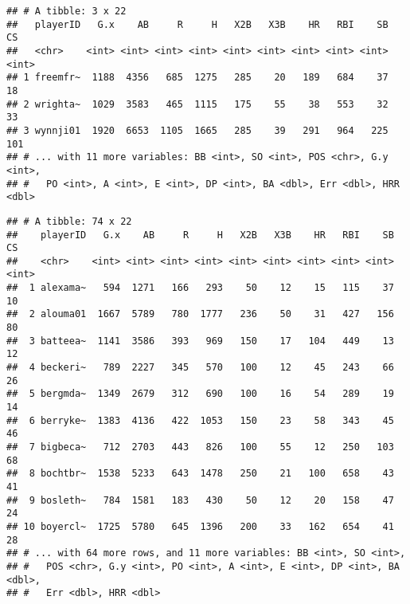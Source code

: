 \documentclass[]{book}
\newenvironment{Shaded}{\begin{snugshade}}{\end{snugshade}}
\newcommand{\KeywordTok}[1]{\textcolor[rgb]{0.13,0.29,0.53}{\textbf{#1}}}
\newcommand{\DecValTok}[1]{\textcolor[rgb]{0.00,0.00,0.81}{#1}}
\newcommand{\StringTok}[1]{\textcolor[rgb]{0.31,0.60,0.02}{#1}}
\newcommand{\OperatorTok}[1]{\textcolor[rgb]{0.81,0.36,0.00}{\textbf{#1}}}
\newcommand{\NormalTok}[1]{#1}
\begin{document}
\begin{verbatim}
## # A tibble: 3 x 22
##   playerID   G.x    AB     R     H   X2B   X3B    HR   RBI    SB    CS
##   <chr>    <int> <int> <int> <int> <int> <int> <int> <int> <int> <int>
## 1 freemfr~  1188  4356   685  1275   285    20   189   684    37    18
## 2 wrighta~  1029  3583   465  1115   175    55    38   553    32    33
## 3 wynnji01  1920  6653  1105  1665   285    39   291   964   225   101
## # ... with 11 more variables: BB <int>, SO <int>, POS <chr>, G.y <int>,
## #   PO <int>, A <int>, E <int>, DP <int>, BA <dbl>, Err <dbl>, HRR <dbl>
\end{verbatim}

\begin{Shaded}
\end{Shaded}

\begin{verbatim}
## # A tibble: 74 x 22
##    playerID   G.x    AB     R     H   X2B   X3B    HR   RBI    SB    CS
##    <chr>    <int> <int> <int> <int> <int> <int> <int> <int> <int> <int>
##  1 alexama~   594  1271   166   293    50    12    15   115    37    10
##  2 alouma01  1667  5789   780  1777   236    50    31   427   156    80
##  3 batteea~  1141  3586   393   969   150    17   104   449    13    12
##  4 beckeri~   789  2227   345   570   100    12    45   243    66    26
##  5 bergmda~  1349  2679   312   690   100    16    54   289    19    14
##  6 berryke~  1383  4136   422  1053   150    23    58   343    45    46
##  7 bigbeca~   712  2703   443   826   100    55    12   250   103    68
##  8 bochtbr~  1538  5233   643  1478   250    21   100   658    43    41
##  9 bosleth~   784  1581   183   430    50    12    20   158    47    24
## 10 boyercl~  1725  5780   645  1396   200    33   162   654    41    28
## # ... with 64 more rows, and 11 more variables: BB <int>, SO <int>,
## #   POS <chr>, G.y <int>, PO <int>, A <int>, E <int>, DP <int>, BA <dbl>,
## #   Err <dbl>, HRR <dbl>
\end{verbatim}
\end{document}
